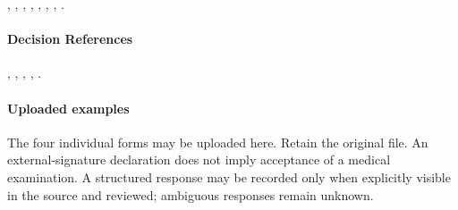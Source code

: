 \hyperref[br:022]{}, \hyperref[br:023]{}, \hyperref[br:024]{}, \hyperref[br:025]{}, \hyperref[br:026]{}, \hyperref[br:027]{}, \hyperref[br:028]{}, \hyperref[br:030]{}.

\paragraph{Decision References}
, , , , .

\paragraph{Uploaded examples}
The four individual forms may be uploaded here. Retain the
original file. An external-signature declaration does not imply acceptance of a
medical examination. A structured response may be recorded only when explicitly
visible in the source and reviewed; ambiguous responses remain unknown.
